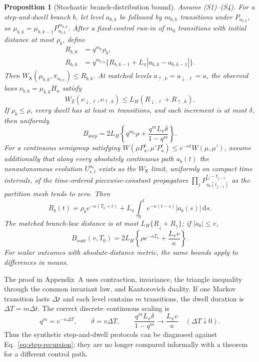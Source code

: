 \documentclass[10pt,a4paper]{article}
\newcommand{\dd}{\mathrm{d}}
\newtheorem{proposition}{Proposition}
\begin{document}
\begin{proposition}[Stochastic branch-distribution bound]
\label{prop:stochastic-rate-separation}
Assume (S1)--(S4). For a step-and-dwell branch $b$, let level $a_{b,k}$ be followed by $m_{b,k}$ transitions under $P_{a_{b,k}}$, so $\mu_{b,k}=\mu_{b,k-1}P_{a_{b,k}}^{m_{b,k}}$. After a fixed-control run-in of $m_0$ transitions with initial distance at most $\rho_b$, define
\begin{align}
R_{b,0}&=q^{m_0}\rho_b,\\
R_{b,k}&=q^{m_{b,k}}\{R_{b,k-1}+L_\pi|a_{b,k}-a_{b,k-1}|\}.
\label{eq:step-recursion}
\end{align}
Then $W_{\mathsf X}(\mu_{b,k},\pi_{a_{b,k}})\leq R_{b,k}$. At matched levels $a_{\uparrow,k}=a_{\downarrow,\ell}=a$, the observed laws $\nu_{b,k}=\mu_{b,k}H_a$ satisfy
\begin{equation}
W_{\mathsf Z}(\nu_{\downarrow,\ell},\nu_{\uparrow,k})
\leq L_H(R_{\downarrow,\ell}+R_{\uparrow,k}).
\label{eq:step-branch-bound}
\end{equation}
If $\rho_b\leq\rho$, every dwell has at least $m$ transitions, and each increment is at most $\delta$, then uniformly
\begin{equation}
B_{\mathrm{step}}=2L_H\!\left\{q^{m_0}\rho+
\frac{q^mL_\pi\delta}{1-q^m}\right\}.
\label{eq:step-uniform-bound}
\end{equation}
For a continuous semigroup satisfying $W(\mu P_a^t,\mu'P_a^t)\leq e^{-\kappa t}W(\mu,\mu')$, assume additionally that along every absolutely continuous path $a_b(t)$ the nonautonomous evolution $U_{s,t}^{a_b}$ exists as the $W_{\mathsf X}$ limit, uniformly on compact time intervals, of the time-ordered piecewise-constant propagators $\prod_jP_{a_b(t_{j-1})}^{t_j-t_{j-1}}$ as the partition mesh tends to zero. Then
\begin{equation}
R_b(t)=\rho_b e^{-\kappa(T_0+t)}+L_\pi\int_0^t e^{-\kappa(t-s)}|\dot a_b(s)|\,\dd s.
\end{equation}
The matched branch-law distance is at most $L_H\{R_\downarrow+R_\uparrow\}$; if $|\dot a_b|\leq v$,
\begin{equation}
B_{\mathrm{cont}}(v,T_0)=2L_H\!\left\{\rho e^{-\kappa T_0}+\frac{L_\pi v}{\kappa}\right\}.
\label{eq:continuous-bound}
\end{equation}
For scalar outcomes with absolute-distance metric, the same bounds apply to differences in means.
\end{proposition}

The proof in Appendix~A uses contraction, invariance, the triangle inequality through the common invariant law, and Kantorovich duality. If one Markov transition lasts $\Delta t$ and each level contains $m$ transitions, the dwell duration is $\Delta T=m\Delta t$. The correct discrete--continuous scaling is
\begin{equation}
q^m=e^{-\kappa\Delta T},\qquad \delta=v\Delta T,
\qquad
\frac{q^mL_\pi\delta}{1-q^m}\longrightarrow\frac{L_\pi v}{\kappa}
\quad(\Delta T\downarrow0).
\end{equation}
Thus the synthetic step-and-dwell protocols can be diagnosed against Eq.~\eqref{eq:step-recursion}; they are no longer compared informally with a theorem for a different control path.
\end{document}
